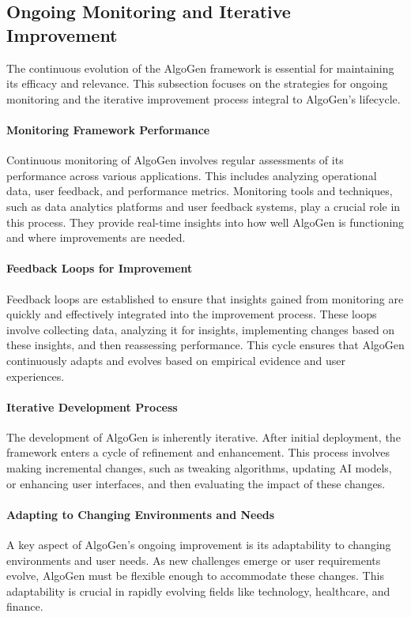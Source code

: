 \documentclass{article}
\begin{document}
\subsection{Ongoing Monitoring and Iterative Improvement}
The continuous evolution of the AlgoGen framework is essential for maintaining its efficacy and relevance. This subsection focuses on the strategies for ongoing monitoring and the iterative improvement process integral to AlgoGen’s lifecycle.

\paragraph{Monitoring Framework Performance}
Continuous monitoring of AlgoGen involves regular assessments of its performance across various applications. This includes analyzing operational data, user feedback, and performance metrics. Monitoring tools and techniques, such as data analytics platforms and user feedback systems, play a crucial role in this process. They provide real-time insights into how well AlgoGen is functioning and where improvements are needed.

\paragraph{Feedback Loops for Improvement}
Feedback loops are established to ensure that insights gained from monitoring are quickly and effectively integrated into the improvement process. These loops involve collecting data, analyzing it for insights, implementing changes based on these insights, and then reassessing performance. This cycle ensures that AlgoGen continuously adapts and evolves based on empirical evidence and user experiences.

\paragraph{Iterative Development Process}
The development of AlgoGen is inherently iterative. After initial deployment, the framework enters a cycle of refinement and enhancement. This process involves making incremental changes, such as tweaking algorithms, updating AI models, or enhancing user interfaces, and then evaluating the impact of these changes.

\paragraph{Adapting to Changing Environments and Needs}
A key aspect of AlgoGen’s ongoing improvement is its adaptability to changing environments and user needs. As new challenges emerge or user requirements evolve, AlgoGen must be flexible enough to accommodate these changes. This adaptability is crucial in rapidly evolving fields like technology, healthcare, and finance.
\end{document}
